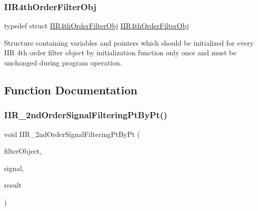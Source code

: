 \mbox{\label{group___i_i_rfilter_pt_by_pt_ga926ddf6d792e658ea77b7321c3d4fe0d_ga926ddf6d792e658ea77b7321c3d4fe0d}} 
\subsubsection{\texorpdfstring{IIR4thOrderFilterObj}{IIR4thOrderFilterObj}}
{\footnotesize\ttfamily typedef struct \mbox{\hyperlink{struct_i_i_r4th_order_filter_obj}{I\+I\+R4th\+Order\+Filter\+Obj}}  \mbox{\hyperlink{struct_i_i_r4th_order_filter_obj}{I\+I\+R4th\+Order\+Filter\+Obj}}}



Structure containing variables and pointers which should be initialized for every I\+IR 4th order filter object by initialization function only once and must be unchanged during program operation. 



\subsection{Function Documentation}
\mbox{\label{group___i_i_rfilter_pt_by_pt_gac4abd6664e9f907ee9a9a7dc9bb9f72a_gac4abd6664e9f907ee9a9a7dc9bb9f72a}} 
\subsubsection{\texorpdfstring{IIR\_2ndOrderSignalFilteringPtByPt()}{IIR\_2ndOrderSignalFilteringPtByPt()}}
{\footnotesize\ttfamily void I\+I\+R\+\_\+2nd\+Order\+Signal\+Filtering\+Pt\+By\+Pt (\begin{DoxyParamCaption}\item[{\mbox{\hyperlink{struct_i_i_r2nd_order_filter_obj}{I\+I\+R2nd\+Order\+Filter\+Obj}} $\ast$}]{filter\+Object,  }\item[{float}]{signal,  }\item[{float $\ast$}]{result }\end{DoxyParamCaption})}



